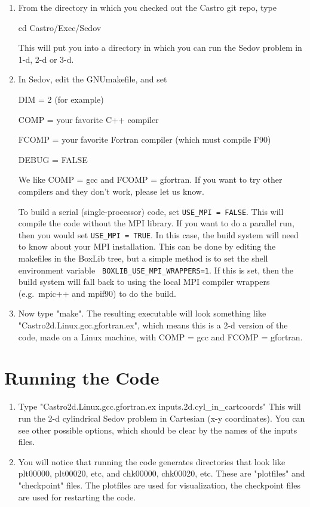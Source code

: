 \begin{enumerate}

\item From the directory in which you checked out the Castro git repo, type

cd Castro/Exec/Sedov

This will put you into a directory in which you can run the Sedov problem in 1-d, 2-d or 3-d.
\item In Sedov, edit the GNUmakefile, and set

DIM = 2 (for example)

COMP = your favorite C++ compiler

FCOMP = your favorite Fortran compiler (which must compile F90)

DEBUG = FALSE

We like COMP = gcc and FCOMP = gfortran.  If you want to try other compilers and they don't work, 
please let us know.  

To build a serial (single-processor) code, set {\tt USE\_MPI = FALSE}.
This will compile the code without the MPI library.  If you want to do
a parallel run, then you would set {\tt USE\_MPI = TRUE}.  In this
case, the build system will need to know about your MPI installation.
This can be done by editing the makefiles in the BoxLib tree, but a
simple method is to set the shell environment variable {\tt
  BOXLIB\_USE\_MPI\_WRAPPERS=1}.  If this is set, then the build
system will fall back to using the local MPI compiler wrappers
(e.g.\ mpic++ and mpif90) to do the build.

\item Now type "make". The resulting executable will look something like 
"Castro2d.Linux.gcc.gfortran.ex", which means this is a 2-d version of the code, 
made on a Linux machine, with COMP = gcc and FCOMP = gfortran.

\end{enumerate}

\section{Running the Code}

\begin{enumerate}

\item Type "Castro2d.Linux.gcc.gfortran.ex inputs.2d.cyl\_in\_cartcoords" 
This will run the 2-d cylindrical Sedov problem in Cartesian (x-y coordinates). 
You can see other possible options, which should be clear by the names of the inputs files.

\item You will notice that running the code generates directories that look like 
plt00000, plt00020, etc, and chk00000, chk00020, etc. These are "plotfiles" and 
"checkpoint" files. The plotfiles are used for visualization, the checkpoint files are 
used for restarting the code.

\end{enumerate}

